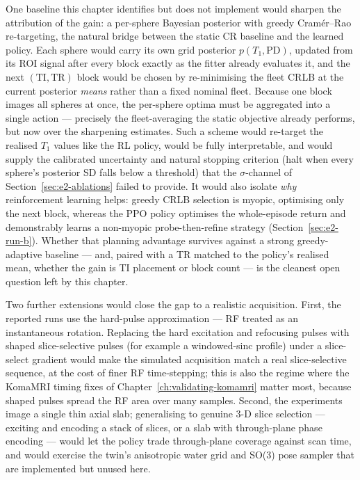 One baseline this chapter identifies but does not implement would sharpen the
attribution of the gain: a per-sphere Bayesian posterior with greedy
Cram\'er--Rao re-targeting, the natural bridge between the static CR baseline
and the learned policy. Each sphere would carry its own grid posterior
$p(T_1,\mathrm{PD})$, updated from its ROI signal after every block exactly as
the fitter already evaluates it, and the next $(\mathrm{TI},\mathrm{TR})$ block
would be chosen by re-minimising the fleet CRLB at the current posterior
\emph{means} rather than a fixed nominal fleet. Because one block images all
spheres at once, the per-sphere optima must be aggregated into a single
action --- precisely the fleet-averaging the static objective already performs,
but now over the sharpening estimates. Such a scheme would re-target the
realised $T_1$ values like the RL policy, would be fully interpretable, and
would supply the calibrated uncertainty and natural stopping criterion (halt
when every sphere's posterior SD falls below a threshold) that the
$\sigma$-channel of Section~\ref{sec:e2-ablations} failed to provide. It would
also isolate \emph{why} reinforcement learning helps: greedy CRLB selection is
myopic, optimising only the next block, whereas the PPO policy optimises the
whole-episode return and demonstrably learns a non-myopic probe-then-refine
strategy (Section~\ref{sec:e2-run-b}). Whether that planning advantage survives
against a strong greedy-adaptive baseline --- and, paired with a TR matched to
the policy's realised mean, whether the gain is TI placement or block count ---
is the cleanest open question left by this chapter.

Two further extensions would close the gap to a realistic acquisition. First,
the reported runs use the hard-pulse approximation --- RF treated as an
instantaneous rotation. Replacing the hard excitation and refocusing pulses
with shaped slice-selective pulses (for example a windowed-sinc profile) under
a slice-select gradient would make the simulated acquisition match a real
slice-selective sequence, at the cost of finer RF time-stepping; this is also
the regime where the KomaMRI timing fixes of
Chapter~\ref{ch:validating-komamri} matter most, because shaped pulses spread
the RF area over many samples. Second, the experiments image a single thin
axial slab; generalising to genuine 3-D slice selection --- exciting and
encoding a stack of slices, or a slab with through-plane phase encoding ---
would let the policy trade through-plane coverage against scan time, and would
exercise the twin's anisotropic water grid and SO(3) pose sampler that are
implemented but unused here.

